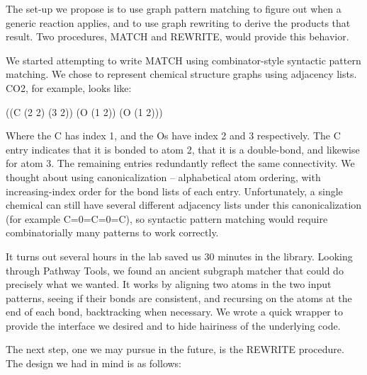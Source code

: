 The set-up we propose is to use graph pattern matching to figure out
when a generic reaction applies, and to use graph rewriting to derive
the products that result. Two procedures, MATCH and REWRITE, would
provide this behavior.

We started attempting to write MATCH using combinator-style syntactic
pattern matching. We chose to represent chemical structure graphs
using adjacency lists. CO2, for example, looks like:

((C (2 2) (3 2)) 
 (O (1 2)) 
 (O (1 2))) 

 Where the C has index 1, and the Os have index 2 and 3 respectively. The C
 entry indicates that it is bonded to atom 2, that it is a double-bond, and
 likewise for atom 3. The remaining entries redundantly reflect the same
 connectivity.  We thought about using canonicalization -- alphabetical
 atom ordering, with increasing-index order for the bond lists of each
 entry. Unfortunately, a single chemical can still have several different
 adjacency lists under this canonicalization (for example C=0=C=0=C), so
 syntactic pattern matching would require combinatorially many patterns to
 work correctly.

It turns out several hours in the lab saved us 30 minutes in the library.
Looking through Pathway Tools, we found an ancient subgraph matcher
that could do precisely what we wanted. It works by aligning two atoms
in the two input patterns, seeing if their bonds are consistent, and
recursing on the atoms at the end of each bond, backtracking when
necessary. We wrote a quick wrapper to provide the interface we desired
and to hide hairiness of the underlying code.

The next step, one we may pursue in the future, is the REWRITE procedure.
The design we had in mind is as follows:

\vspace{.1in}

